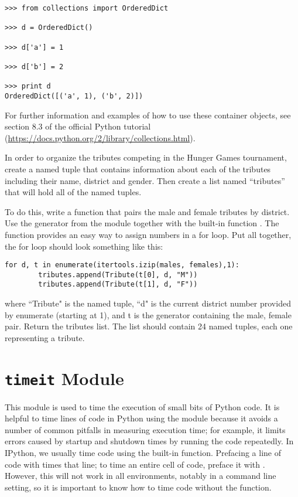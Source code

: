 \begin{lstlisting}
>>> from collections import OrderedDict

>>> d = OrderedDict()

>>> d['a'] = 1

>>> d['b'] = 2

>>> print d
OrderedDict([('a', 1), ('b', 2)])

\end{lstlisting}

For further information and examples of how to use these container objects, see section 8.3 of the official Python tutorial (\url{https://docs.python.org/2/library/collections.html}).

\begin{problem}
In order to organize the tributes competing in the Hunger Games tournament, create a named tuple that contains information about each of the tributes including their name, district and gender. Then create a list named ``tributes'' that will hold all of the named tuples.

To do this, write a function that pairs the male and female tributes by district. Use the  generator from the  module together with the built-in function . The  function provides an easy way to assign numbers in a for loop.
Put all together, the for loop should look something like this:

\begin{lstlisting}
for d, t in enumerate(itertools.izip(males, females),1):
        tributes.append(Tribute(t[0], d, "M"))
        tributes.append(Tribute(t[1], d, "F"))
\end{lstlisting}

where ``Tribute" is the named tuple, ``d" is the current district number provided by enumerate (starting at 1), and t is the  generator containing the male, female pair. Return the tributes list. The list should contain 24 named tuples, each one representing a tribute.
\end{problem}


\section*{\texttt{timeit} Module}
This module is used to time the execution of small bits of Python code.
It is helpful to time lines of code in Python using the  module because it avoids a number of common pitfalls in measuring execution time; for example, it limits errors caused by startup and shutdown times by running the code repeatedly. In IPython, we usually time code using the built-in  function. Prefacing a line of code with  times that line; to time an entire cell of code, preface it with . However, this will not work in all environments, notably in a command line setting, so it is important to know how to time code without the  function.


